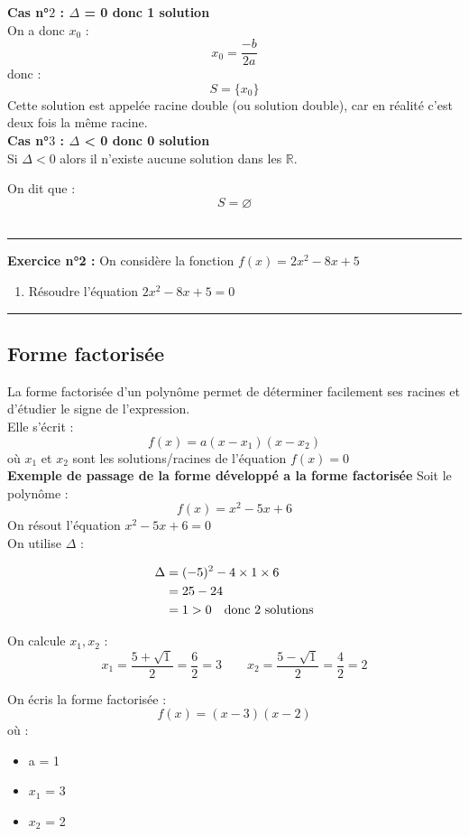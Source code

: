\documentclass{article}
\begin{document}
	
	\textbf{Cas n°$2$ : $\Delta$ = 0 donc 1 solution} \\
	On a donc $x_0$ :
	\[
	x_0 = \frac{-b}{2a}
	\]
	donc : 
	\[
	S = \{x_0\}
	\]
	Cette solution est appelée racine double (ou solution double), car en réalité c’est deux fois la même racine.\\
	
	\textbf{Cas n°$3$ : $\Delta$ < 0 donc 0 solution} \\
	Si $\Delta < 0$ alors il n'existe aucune solution dans les $\mathbb{R}$.
	
	\noindent On dit que :
	\[
		S = \varnothing
	\]\\
	
	\rule{\textwidth}{0.4pt}
	\noindent \textbf{Exercice n°2 :}
	On considère la fonction $f(x) = 2x^2 - 8x + 5$
	
	\begin{enumerate}
		\item Résoudre l'équation $2x^2 - 8x + 5 = 0$
	\end{enumerate}
	
	\rule{\textwidth}{0.4pt}
	\subsection{Forme factorisée}
	La forme factorisée d'un polynôme permet de déterminer facilement ses racines et d'étudier le signe de l'expression.\\
	Elle s'écrit : 
	\[
		f(x) = a(x-x_1)(x-x_2)
	\]
	où $x_1$ et $x_2$ sont les solutions/racines de l'équation $f(x) = 0$\\
	
	\textbf{Exemple de passage de la forme développé a la forme factorisée}
	Soit le polynôme :
	\[
		f(x) = x^2 - 5x + 6
	\]
	On résout l'équation $x^2 - 5x + 6 = 0$\\
	On utilise $\Delta$ :
	
	\begin{align*}
		\Delta &= (-5)^2 - 4 \times 1 \times 6 \\
		&= 25 - 24 \\
		&= 1 > 0 \text{\quad donc 2 solutions}
	\end{align*}
	
	\noindent On calcule $x_1, x_2$ : 
	\[
	x_1 = \frac{5 + \sqrt{1}}{2} = \frac{6}{2} = 3 \quad \quad x_2 = \frac{5 - \sqrt{1}}{2} = \frac{4}{2} = 2
	\]
	
	\noindent On écris la forme factorisée :
	\[
		f(x) = (x - 3)(x - 2)
	\]
	où :
	\begin{itemize}
		\item a = 1
		\item $x_1$ = 3
		\item $x_2$ = 2
	\end{itemize}
	
\end{document}
